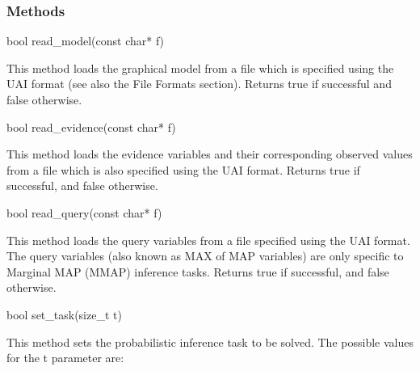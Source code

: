 \subsubsection*{Methods}

\begin{DoxyVerb}    bool read_model(const char* f)
\end{DoxyVerb}
 This method loads the graphical model from a file which is specified using the U\+A\+I format (see also the File Formats section). Returns {\ttfamily true} if successful and {\ttfamily false} otherwise. \begin{DoxyVerb}    bool read_evidence(const char* f)
\end{DoxyVerb}
 This method loads the evidence variables and their corresponding observed values from a file which is also specified using the U\+A\+I format. Returns {\ttfamily true} if successful, and {\ttfamily false} otherwise. \begin{DoxyVerb}    bool read_query(const char* f)
\end{DoxyVerb}
 This method loads the query variables from a file specified using the U\+A\+I format. The query variables (also known as M\+A\+X of M\+A\+P variables) are only specific to Marginal M\+A\+P (M\+M\+A\+P) inference tasks. Returns {\ttfamily true} if successful, and {\ttfamily false} otherwise. \begin{DoxyVerb}    bool set_task(size_t t)
\end{DoxyVerb}
 This method sets the probabilistic inference task to be solved. The possible values for the {\ttfamily t} parameter are\+:
